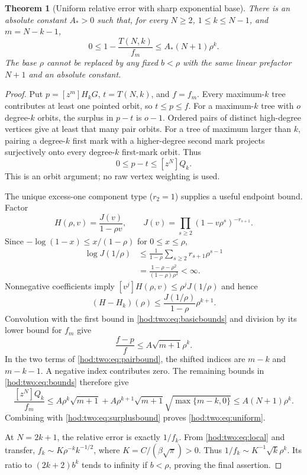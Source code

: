 \documentclass[11pt,letterpaper]{article}
\newtheorem{theorem}{Theorem}[section]
\theoremstyle{definition}\newtheorem{definition}[theorem]{Definition}
\theoremstyle{remark}\newtheorem{remark}[theorem]{Remark}
\begin{document}
\begin{theorem}[Uniform relative error with sharp exponential base]\label{hod:two:thm:uniform}
There is an absolute constant $A_*>0$ such that, for every $N\ge2$, $1\le k\le N-1$, and $m=N-k-1$,
\begin{equation}\label{hod:two:eq:uniform}
0\le1-\frac{T(N,k)}{f_m}\le A_*(N+1)\rho^k.
\end{equation}
The base $\rho$ cannot be replaced by any fixed $b<\rho$ with the same linear prefactor $N+1$ and an absolute constant.
\end{theorem}
\begin{proof}
Put $p=[z^m]H_kG$, $t=T(N,k)$, and $f=f_m$. Every maximum-$k$ tree contributes at least one pointed orbit, so $t\le p\le f$. For a maximum-$k$ tree with $o$ degree-$k$ orbits, the surplus in $p-t$ is $o-1$. Ordered pairs of distinct high-degree vertices give at least that many pair orbits. For a tree of maximum larger than $k$, pairing a degree-$k$ first mark with a higher-degree second mark projects surjectively onto every degree-$k$ first-mark orbit. Thus
\begin{equation}\label{hod:two:eq:surplusbound}
0\le p-t\le[z^N]Q_k.
\end{equation}
This is an orbit argument; no raw vertex weighting is used.

The unique excess-one component type ($r_2=1$) supplies a useful endpoint bound. Factor
\[
H(\rho,v)=\frac{J(v)}{1-\rho v},\qquad
J(v)=\prod_{s\ge2}(1-v\rho^s)^{-r_{s+1}}.
\]
Since $-\log(1-x)\le x/(1-\rho)$ for $0\le x\le\rho$,
\begin{align*}
\log J(1/\rho)
&\le\frac1{1-\rho}\sum_{s\ge2}r_{s+1}\rho^{s-1}\\
&=\frac{1-\rho-\rho^2}{(1-\rho)\rho^2}<\infty.
\end{align*}
Nonnegative coefficients imply $[v^j]H(\rho,v)\le\rho^jJ(1/\rho)$ and hence
\begin{equation}\label{hod:two:eq:foresttail}
(H-H_k)(\rho)\le\frac{J(1/\rho)}{1-\rho}\rho^{k+1}.
\end{equation}
Convolution with the first bound in \eqref{hod:two:eq:basicbounds} and division by its lower bound for $f_m$ give
\[
\frac{f-p}{f}\le A\sqrt{m+1}\rho^k.
\]
In the two terms of \eqref{hod:two:eq:pairbound}, the shifted indices are $m-k$ and $m-k-1$. A negative index contributes zero. The remaining bounds in \eqref{hod:two:eq:bounds} therefore give
\[
\frac{[z^N]Q_k}{f_m}
\le A\rho^k\sqrt{m+1}
 +A\rho^{k+1}\sqrt{m+1}\sqrt{\max\{m-k,0\}}
\le A(N+1)\rho^k.
\]
Combining with \eqref{hod:two:eq:surplusbound} proves \eqref{hod:two:eq:uniform}.

At $N=2k+1$, the relative error is exactly $1/f_k$. From \eqref{hod:two:eq:local} and transfer,
$f_k\sim K\rho^{-k}k^{-1/2}$, where $K=C/(\beta\sqrt\pi)>0$.
Thus $1/f_k\sim K^{-1}\sqrt{k}\rho^k$. Its ratio to $(2k+2)b^k$ tends to infinity if $b<\rho$, proving the final assertion.
\end{proof}
\end{document}

